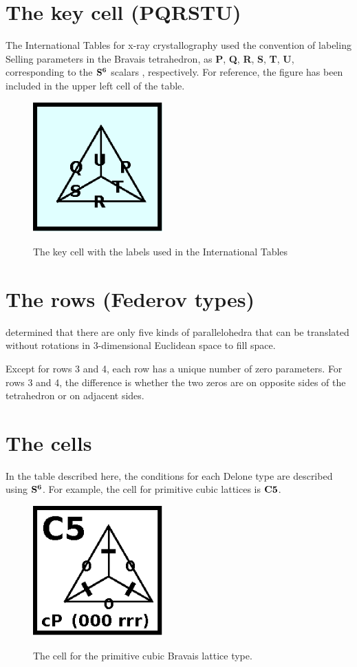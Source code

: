 \documentclass[preprint]{iucr}              %
\numberwithin{equation}{section}
\newcommand{\SVI}[0]{$\bf{S^{6}}$}
\begin{document}
\section{The key cell (PQRSTU)}

The International Tables for x-ray crystallography \cite{vonLaue1952}
used the convention of labeling Selling parameters in the Bravais
tetrahedron, as \textbf{P}, \textbf{Q}, \textbf{R}, \textbf{S}, \textbf{T}, \textbf{U}, corresponding to the \SVI{} scalars
\Svec, respectively. For reference,
the figure has been included in the upper left cell of the table.
		\begin{figure}
		\includegraphics[width=5cm]{PQRSTU}
		\label{PQRSTU}
		\caption{The key cell with the labels used in the
		International Tables}
	\end{figure}
	
\section{The rows (Federov types)}
	
	 determined that there are only
	five kinds of parallelohedra that can be translated without rotations in 3-dimensional Euclidean space to fill space. 
	
	Except for rows 3 and 4, each row has a unique number of zero
	parameters. For rows 3 and 4, the difference is whether the two
	zeros are on opposite sides of the tetrahedron or on 
	adjacent sides.
	
\section{The cells}
	
		In the table described here, the conditions for each Delone
	type are described using \SVI{}. For example, the cell for
	primitive cubic lattices is $\bf{C5}$.
	
	
	\begin{figure}
		\includegraphics[width=5cm]{C5}
		\label{C5}
		\caption{The cell for the primitive cubic Bravais lattice type.}
	\end{figure}
	
\end{document}
